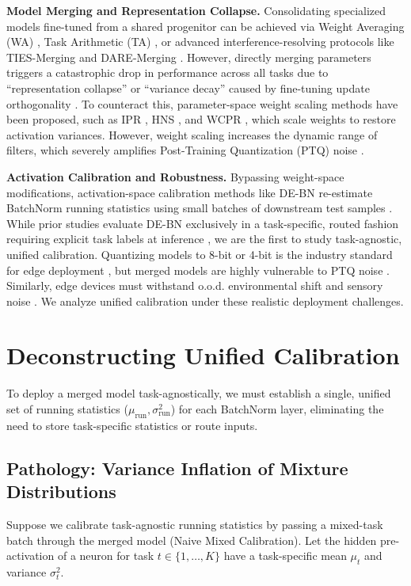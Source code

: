 \documentclass{article}
\theoremstyle{plain}
\theoremstyle{definition}
\theoremstyle{remark}
\begin{document}
\textbf{Model Merging and Representation Collapse.} Consolidating specialized models fine-tuned from a shared progenitor can be achieved via Weight Averaging (WA) \cite{Wortsman2022Soups}, Task Arithmetic (TA) \cite{Ilharco2023TaskArithmetic}, or advanced interference-resolving protocols like TIES-Merging \cite{Yadav2023Ties} and DARE-Merging \cite{Yu2024Dare, Jin2023Dare}. However, directly merging parameters triggers a catastrophic drop in performance across all tasks due to ``representation collapse'' or ``variance decay'' caused by fine-tuning update orthogonality \cite{Jordan2023Repair}. To counteract this, parameter-space weight scaling methods have been proposed, such as IPR \cite{Leclaire2024Ipr}, HNS \cite{Visionary2026Hns}, and WCPR \cite{Leclaire2024Wcpr}, which scale weights to restore activation variances. However, weight scaling increases the dynamic range of filters, which severely amplifies Post-Training Quantization (PTQ) noise \cite{Anonymous2026Qcot}.

\textbf{Activation Calibration and Robustness.} Bypassing weight-space modifications, activation-space calibration methods like DE-BN re-estimate BatchNorm running statistics using small batches of downstream test samples \cite{Jordan2023Repair, Kim2024TaskSpecific}. While prior studies evaluate DE-BN exclusively in a task-specific, routed fashion requiring explicit task labels at inference \cite{Jordan2023Repair, Shin2025MergeFriendly}, we are the first to study task-agnostic, unified calibration. Quantizing models to 8-bit or 4-bit is the industry standard for edge deployment \cite{Han2016DeepCompression, Gholami2021QuantizationSurvey}, but merged models are highly vulnerable to PTQ noise \cite{Anonymous2026Qcot, Wang2026ExpertGuided}. Similarly, edge devices must withstand o.o.d. environmental shift and sensory noise \cite{Nado2020Robustness, Schneider2020Covariate}. We analyze unified calibration under these realistic deployment challenges.

\section{Deconstructing Unified Calibration}
\label{sec:deconstruction}

To deploy a merged model task-agnostically, we must establish a single, unified set of running statistics ($\mu_{\text{run}}, \sigma^2_{\text{run}}$) for each BatchNorm layer, eliminating the need to store task-specific statistics or route inputs.

\subsection{Pathology: Variance Inflation of Mixture Distributions}
Suppose we calibrate task-agnostic running statistics by passing a mixed-task batch through the merged model (Naive Mixed Calibration). Let the hidden pre-activation of a neuron for task $t \in \{1, \dots, K\}$ have a task-specific mean $\mu_t$ and variance $\sigma^2_t$. 
\end{document}
